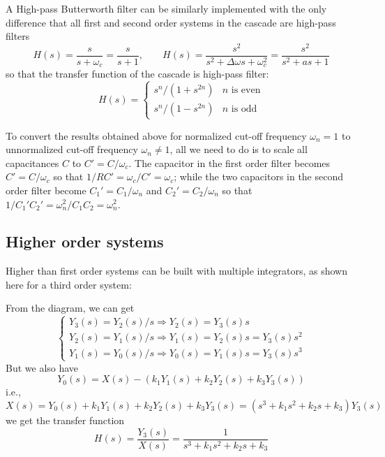 \documentclass{article}
\begin{document}
  A High-pass Butterworth filter can be similarly implemented with the only
  difference that all first and second order systems in the cascade are
  high-pass filters
  \begin{equation}
  H(s)=\frac{s}{s+\omega_c}=\frac{s}{s+1},\;\;\;\;\;\;\;
  H(s)=\frac{s^2}{s^2+\Delta\omega s+\omega_c^2}=\frac{s^2}{s^2+a s+1}
  \end{equation}
  so that the transfer function of the cascade is high-pass filter:
  \begin{equation}
  H(s)=\left\{\begin{array}{cc}s^n/(1+s^{2n}) & \mbox{$n$ is even}\\
  s^n/(1-s^{2n}) & \mbox{$n$ is odd}\end{array}\right.
  \end{equation}

  To convert the results obtained above for normalized cut-off frequency 
  $\omega_n=1$ to unnormalized cut-off frequency $\omega_n\ne 1$, all we 
  need to do is to scale all capacitances $C$ to $C'=C/\omega_c$. The 
  capacitor in the first order filter becomes $C'=C/\omega_c$ so that
  $1/RC'=\omega_c/C'=\omega_c$; while the two capacitors in the second order
  filter become $C_1'=C_1/\omega_n$ and $C_2'=C_2/\omega_n$ so that
  $1/C_1'C_2'=\omega_n^2/C_1C_2=\omega_n^2$.

\subsection{Higher order systems}

Higher than first order systems can be built with multiple integrators, 
as shown here for a third order system:


From the diagram, we can get
\begin{equation}
\left\{ \begin{array}{l}
	Y_3(s)=Y_2(s)/s \Longrightarrow Y_2(s)=Y_3(s)s	\\
	Y_2(s)=Y_1(s)/s \Longrightarrow Y_1(s)=Y_2(s)s=Y_3(s)s^2	\\
	Y_1(s)=Y_0(s)/s \Longrightarrow Y_0(s)=Y_1(s)s=Y_3(s)s^3	
\end{array} \right.
\end{equation}
But we also have
\begin{equation}	Y_0(s)=X(s)-(k_1Y_1(s)+k_2Y_2(s)+k_3Y_3(s))	\end{equation}
i.e., 
\begin{equation}	X(s)=Y_0(s)+k_1Y_1(s)+k_2Y_2(s)+k_3Y_3(s)=(s^3+k_1s^2+k_2s+k_3) Y_3(s)	\end{equation}
we get the transfer function
\begin{equation}
	H(s)=\frac{Y_3(s)}{X(s)}=\frac{1}{s^3+k_1s^2+k_2s+k_3}
\end{equation}
\end{document}
